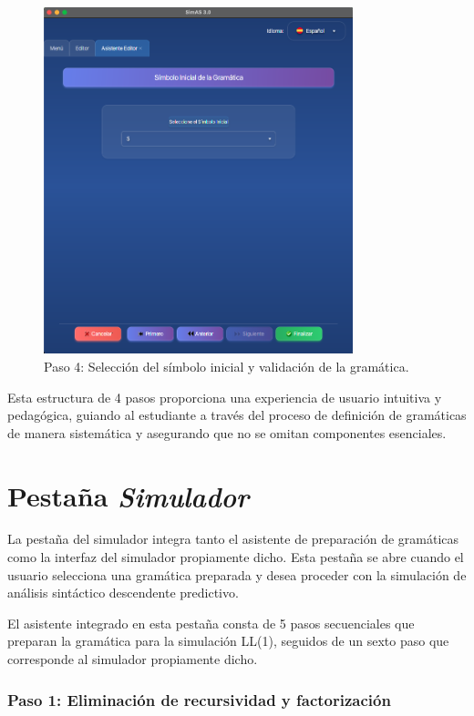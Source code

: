 \needspace{6cm}
\begin{figure}[H]
\centering
\includegraphics[width=0.8\textwidth]{figuras2/editor/paso4_inicial.png}
\caption{Paso 4: Selección del símbolo inicial y validación de la gramática.}
\label{fig:paso4}
\end{figure}

Esta estructura de 4 pasos proporciona una experiencia de usuario intuitiva y pedagógica, guiando al estudiante a través del proceso de definición de gramáticas de manera sistemática y asegurando que no se omitan componentes esenciales.

\section{Pestaña \textit{Simulador}}

La pestaña del simulador integra tanto el asistente de preparación de gramáticas como la interfaz del simulador propiamente dicho. Esta pestaña se abre cuando el usuario selecciona una gramática preparada y desea proceder con la simulación de análisis sintáctico descendente predictivo.

El asistente integrado en esta pestaña consta de 5 pasos secuenciales que preparan la gramática para la simulación LL(1), seguidos de un sexto paso que corresponde al simulador propiamente dicho.

\subsubsection{Paso 1: Eliminación de recursividad y factorización}


